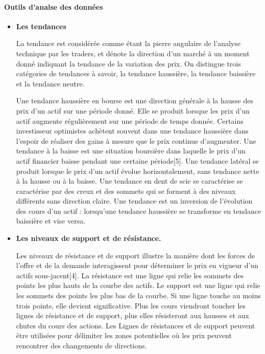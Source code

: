 \paragraph{Outils d'analse des
données}\label{outils-danalse-des-donnuxe9es}

\begin{itemize}
\item
  \textbf{Les tendances}

  La tendance est considérée comme étant la pierre angulaire de
  l'analyse technique par les traders, et dénote la direction d'un
  marché à un moment donné indiquant la tendance de la variation des
  prix. On distingue trois catégories de tendances à savoir, la tendance
  haussière, la tendance baissière et la tendance neutre.

  Une tendance haussière en bourse est une direction générale à la
  hausse des prix d'un actif sur une période donné. Elle se produit
  lorsque les prix d'un actif augmente régulièrement sur une période de
  temps donnée. Certains investisseur optimistes achètent souvent dans
  une tendance haussière dans l'espoir de réaliser des gains à mesure
  que le prix continue d'augmenter. Une tendance à la baisse est une
  situation boursière dans laquelle le prix d'un actif financier baisse
  pendant une certaine période{[}5{]}. Une tendance latéral se produit
  lorsque le prix d'un actif évolue horizontalement, sans tendance nette
  à la hausse ou à la baisse. Une tendance en dent de scie se
  caractérise se caractérise par des creux et des sommets qui se forment
  à des niveaux différents sans direction claire. Une tendance est un
  inversion de l'évolution des cours d'un actif : lorsqu'une tendance
  haussière se transforme en tendance baissière et vise versa.
\item
  \textbf{Les niveaux de support et de résistance.}

  Les niveaux de résistance et de support illustre la manière dont les
  forces de l'offre et de la demande interagissent pour déterminer le
  prix en vigueur d'un actifs sous-jacent{[}4{]}. La résistance est une
  ligne qui relie les sommets des points les plus hauts de la courbe des
  actifs. Le support est une ligne qui relie les sommets des points les
  plus bas de la courbe. Si une ligne touche au moins trois points, elle
  devient significative. Plus les cours viendront toucher les lignes de
  résistance et de support, plus elles résisteront aux hausses et aux
  chutes du cours des actions. Les Lignes de résistances et de support
  peuvent être utilisées pour délimiter les zones potentielles où les
  prix peuvent rencontrer des changements de directions.


\end{itemize}
